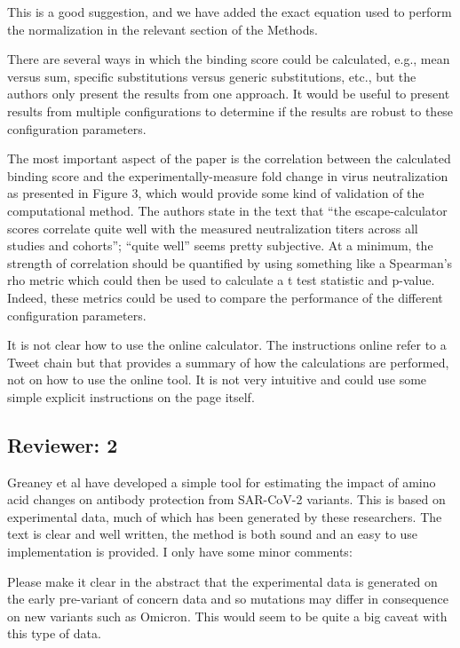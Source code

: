 \documentclass[11pt, oneside]{article}   	%
\newcommand{\response}[1]{{\color{black}#1}}
\begin{document}
\response{This is a good suggestion, and we have added the exact equation used to perform the normalization in the relevant section of the Methods.}

There are several ways in which the binding score could be calculated, e.g., mean versus sum, specific substitutions versus generic substitutions, etc., but the authors only present the results from one approach.  It would be useful to present results from multiple configurations to determine if the results are robust to these configuration parameters.

The most important aspect of the paper is the correlation between the calculated binding score and the experimentally-measure fold change in virus neutralization as presented in Figure 3, which would provide some kind of validation of the computational method.  The authors state in the text that “the escape-calculator scores correlate quite well with the measured neutralization titers across all studies and cohorts”; “quite well” seems pretty subjective.  At a minimum, the strength of correlation should be quantified by using something like a Spearman’s rho metric which could then be used to calculate a t test statistic and p-value.  Indeed, these metrics could be used to compare the performance of the different configuration parameters.

It is not clear how to use the online calculator.  The instructions online refer to a Tweet chain but that provides a summary of how the calculations are performed, not on how to use the online tool.  It is not very intuitive and could use some simple explicit instructions on the page itself.

\subsection*{Reviewer: 2}

Greaney et al have developed a simple tool for estimating the impact of amino acid changes on antibody protection from SAR-CoV-2 variants. This is based on experimental data, much of which has been generated by these researchers. The text is clear and well written, the method is both sound and an easy to use implementation is provided. I only have some minor comments:

Please make it clear in the abstract that the experimental data is generated on the early pre-variant of concern data and so mutations may differ in consequence on new variants such as Omicron. This would seem to be quite a big caveat with this type of data.
\end{document}
